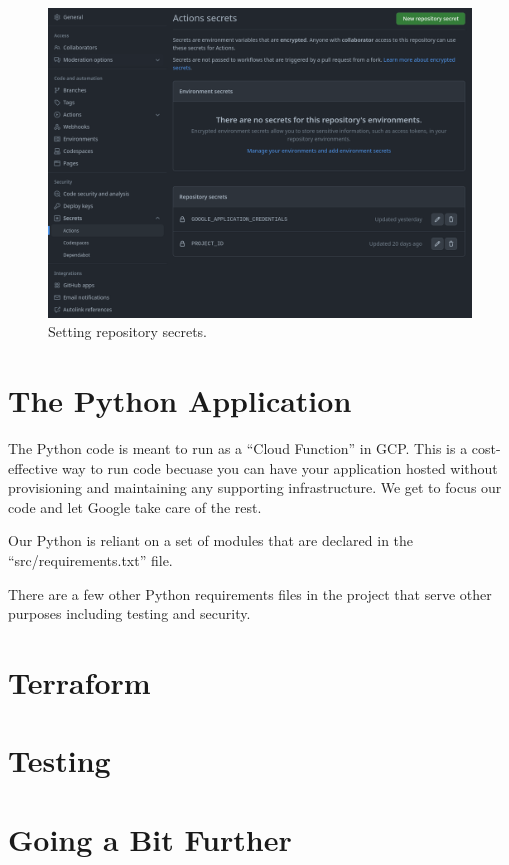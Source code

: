 {\begin{figure}[ht]
	\includegraphics[width=12cm]{images/gh_secrets.png}
	\caption{Setting repository secrets.}
	\label{gh_secrets}
\end{figure}
\vspace{2mm}

\section{\label{sec:Python} The Python Application}

\justifying
The Python code is meant to run as a ``Cloud Function'' in GCP. This is a cost-effective way to run code becuase you can have
your application hosted without provisioning and maintaining any supporting infrastructure. We get to focus our code and let Google
take care of the rest.

\justifying
Our Python is reliant on a set of modules that are declared in the ``src/requirements.txt'' file.


\justifying
There are a few other Python requirements files in the project that serve other purposes including testing and security.


\section{\label{sec:tf}Terraform}

\section{\label{sec:test}Testing}

\section{\label{sec:next}Going a Bit Further}

}
